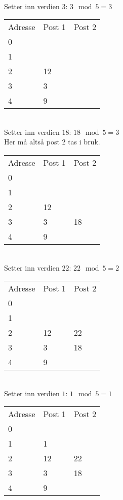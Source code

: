 \documentclass[a4paper, 12pt] {article}
\begin{document}
~\\
Setter inn verdien $3$: $3 \mod 5 = 3$\\
\begin{tabular}{|l|l|l|}
    \hline
    Adresse & Post 1 & Post 2 \\
    0       & ~      & ~      \\
    1       & ~      & ~      \\
    2       & 12     & ~      \\
    3       & 3      & ~      \\
    4       & 9      & ~      \\ \hline
\end{tabular}

~\\
Setter inn verdien $18$: $18 \mod 5 = 3$\\
Her må altså post 2 tas i bruk.\\
\begin{tabular}{|l|l|l|}
    \hline
    Adresse & Post 1 & Post 2 \\
    0       & ~      & ~      \\
    1       & ~      & ~      \\
    2       & 12     & ~      \\
    3       & 3      & 18      \\
    4       & 9      & ~      \\ \hline
\end{tabular}

~\\
Setter inn verdien $22$: $22 \mod 5 = 2$\\
\begin{tabular}{|l|l|l|}
    \hline
    Adresse & Post 1 & Post 2 \\
    0       & ~      & ~      \\
    1       & ~      & ~      \\
    2       & 12     & 22     \\
    3       & 3      & 18     \\
    4       & 9      & ~      \\ \hline
\end{tabular}

~\\
Setter inn verdien $1$: $1 \mod 5 = 1$\\
\begin{tabular}{|l|l|l|}
    \hline
    Adresse & Post 1 & Post 2 \\
    0       & ~      & ~      \\
    1       & 1      & ~      \\
    2       & 12     & 22     \\
    3       & 3      & 18     \\
    4       & 9      & ~      \\ \hline
\end{tabular}
\end{document}
